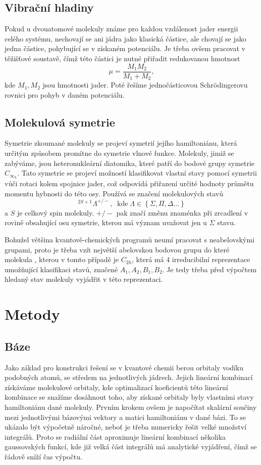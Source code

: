 \subsection{Vibrační hladiny}
Pokud u dvouatomové molekuly známe pro každou vzdálenost jader energii celého systému,
nechovají se ani jádra jako klasická částice, ale chovají se jako jedna částice, pohybující se v získaném potenciálu. Je třeba ovšem pracovat v těžišťové soustavě,
čímž této částici je nutné přiřadit redukovanou hmotnost
\begin{equation}
\mu = \frac{M_1M_2}{M_1+M_2},
\end{equation}
kde $M_1, M_2$ jsou hmotnosti jader. Poté řešíme jednočásticovou Schrödingerovu rovnici pro pohyb v daném potenciálu.
\subsection{Molekulová symetrie}
Symetrie zkoumané molekuly se projeví symetrií jejího hamiltoniánu, která určitým 
způsobem promítne do symetrie vlnové funkce.
Molekuly, jimiž se zabýváme, jsou heteronukleární diatomika, které patří do bodové grupy 
symetrie $C_{\infty_h}$. Tato symetrie se projeví možností klasifikovat vlastní stavy 
pomocí symetrii vůči rotaci kolem spojnice jader, což odpovídá přiřazení určité hodnoty 
průmětu momentu hybnosti do této osy. Používá se značení molekulových stavů
\begin{equation}
^{2S+1}\Lambda^{+/-},\;\;\mathrm{kde }\;\Lambda\in\left\lbrace \Sigma, \Pi,\Delta \dots 
\right\rbrace
\end{equation}
a $S$ je celkový spin molekuly. $+/-$ pak značí změnu znaménka při zrcadlení v rovině 
obsahující osu symetrie, kterou má význam uvažovat jen u $\Sigma$ stavu.

Bohužel většina kvantově-chemických programů neumí pracovat s neabelovskými grupami, 
proto je třeba vzít největší abelovskou bodovou grupu do které molekula , kterou v tomto případě je $C_{2h}$, která má 4 irreducibilní reprezentace umožňující klasifikaci stavů, značené $A_1, A_2, B_1, B_2$. Je tedy třeba před výpočtem hledaný stav molekuly vyjádřit v této reprezentaci.
\section{Metody}
\subsection{Báze}
Jako základ pro konstrukci řešení se v kvantové chemii berou orbitaly vodíku podobných 
atomů, se středem na jednotlivých jádrech. Jejich lineární kombinací získáváme 
molekulové orbitaly, kde optimalizací koeficientů této lineární kombinace se snažíme 
dosáhnout toho, aby získané orbitaly byly vlastními stavy hamiltoniánu dané molekuly.
Prvním krokem ovšem je napočítat skalární součiny mezi jednotlivými bázovými vektory a 
matici hamiltoniánu v dané bázi. To se ukázalo být výpočetně náročné, neboť je třeba 
numericky řešit velké množství integrálů. Proto se radiální část aproximuje lineární 
kombinací několika gaussovských funkcí, kde již velká část integrálů má analytické 
vyjádření, čímž se řádově sníží čas výpočtu.

